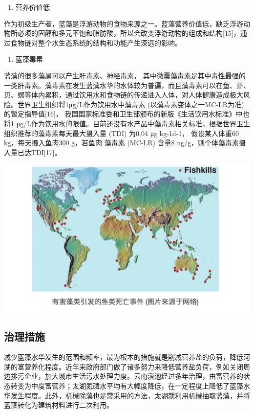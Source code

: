 \documentclass[]{book}
\providecommand{\tightlist}{%
  \setlength{\itemsep}{0pt}\setlength{\parskip}{0pt}}
\begin{document}
\begin{enumerate}
\def\labelenumi{\arabic{enumi}.}
\setcounter{enumi}{1}
\tightlist
\item
  营养价值低
\end{enumerate}

作为初级生产者，蓝藻是浮游动物的食物来源之一。蓝藻营养价值低，缺乏浮游动物所必须的固醇和多元不饱和脂肪酸，所以会改变浮游动物的组成和结构{[}15{]}，通过食物链对整个水生态系统的结构和功能产生深远的影响。

\begin{enumerate}
\def\labelenumi{\arabic{enumi}.}
\setcounter{enumi}{2}
\tightlist
\item
  蓝藻毒素
\end{enumerate}

蓝藻的很多藻属可以产生肝毒素、神经毒素， 其中微囊藻毒素是其中毒性最强的一类肝毒素。藻毒素在发生蓝藻水华的水体较为普遍，而且藻毒素可以在鱼、虾、贝、螺等体内累积，通过饮用水和食物链的传递进入人体，对人体健康造成极大风险。世界卫生组织将1μg/L作为饮用水中藻毒素 (以藻毒素变体之一MC-LR为准) 的暂定指导值{[}16{]}， 我国国家标准委和卫生部颁布的新版《生活饮用水标准》中也将1 μg/L作为饮用水的限值。目前还没有水产品中藻毒素相关标准，根据世界卫生组织推荐的藻毒素每天最大摄入量 (TDI) 为0.04 μg kg-1d-1， 假设某人体重60 kg，每天摄入鱼肉300 g，若鱼肉 藻毒素 (MC-LR) 含量8 ng/g，则个体藻毒素摄入量已达TDI{[}17{]}。

\includegraphics[width=8.33in]{images/lanzao3}

\hypertarget{ux6cbbux7406ux63aaux65bd}{%
\subsection{治理措施}\label{ux6cbbux7406ux63aaux65bd}}

减少蓝藻水华发生的范围和频率，最为根本的措施就是削减营养盐的负荷，降低河湖的富营养化程度。近年来政府部门做了诸多努力来降低营养盐负荷，例如关闭周边排污企业，加大城市生活污水处理力度。云南滇池经过多年治理，由富营养的状态转变为中度富营养；太湖氮磷水平均有大幅度降低，在一定程度上降低了蓝藻水华发生程度。此外，机械除藻也是常采用的方法，太湖就利用机械抽取蓝藻，并将蓝藻转化为建筑材料进行二次利用。
\end{document}
